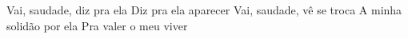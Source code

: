 \beginchorus
Vai, saudade, diz pra ela
Diz pra ela aparecer
Vai, saudade, vê se troca
A minha solidão por ela
Pra valer o meu viver
\endchorus
{}
\vspace{4em} %
\begin{comment}
\lstset{basicstyle=\scriptsize\bf} %
\tab{Solo 1}
\begin{lstlisting}
E|-----------------------------------------------------|
B|-----------------------------------------------------|
G|-----------------------------------------------------|
D|-----------------------------------------------------|
A|-----------------------------------------------------|
E|-----------------------------------------------------|
\end{lstlisting}
\end{comment}
\begin{comment}

\color{drawChord}\gtab{\color{nameChord} X}{}%
\color{drawChord}\gtab{\color{nameChord} X}{}%
\color{drawChord}\gtab{\color{nameChord} X}{}%
\color{drawChord}\gtab{\color{nameChord} X}{}%

\end{comment}
\endsong
